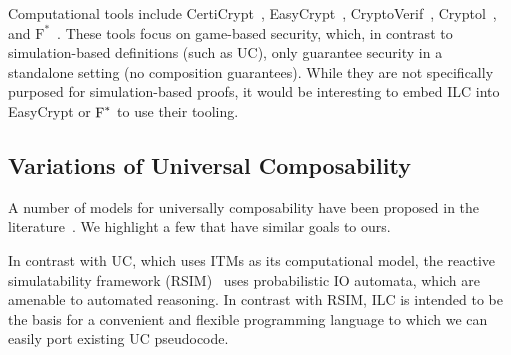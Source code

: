 Computational tools include CertiCrypt~\cite{barthe2009formal},
EasyCrypt~\cite{barthe2011computer}, CryptoVerif~\cite{blanchet2007cryptoverif},
Cryptol~\cite{lewis2003cryptol}, and
$\text{F}^{*}$~\cite{swamy2016dependent}. These tools focus on game-based
security, which, in contrast to simulation-based definitions (such as UC), only
guarantee security in a standalone setting (no composition guarantees). While
they are not specifically purposed for simulation-based proofs, it would be
interesting to embed ILC into EasyCrypt or $\textnormal{F}^{*}$ to use their
tooling.


\subsection{Variations of Universal Composability}
\label{subsec:uc-variants}

A number of models for universally composability have been proposed in the
literature~\cite{canetti2001universally,pfitzmann2001model,
  canetti2003universal,backes2007reactive, canetti2008analyzing,
  maurer2011abstract, maurer2011constructive,
  canetti2015simpler,bohl2016symbolic,hofheinz2015gnuc,camenisch2016universal,
  camenischiuc,camenischmulti}. We highlight a few that have similar goals to
ours.


In contrast with UC, which uses ITMs as its computational model, the reactive
simulatability framework (RSIM)~\cite{backes2007reactive} uses probabilistic IO
automata, which are amenable to automated reasoning.  In contrast with RSIM, ILC
is intended to be the basis for a convenient and flexible programming language
to which we can easily port existing UC pseudocode.

